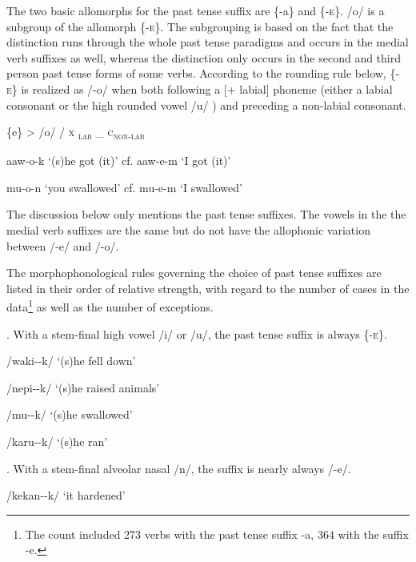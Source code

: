 The two basic allomorphs for the past tense suffix are \{-a\} and \{-\textsc{e}\}. /\textstyleStyleVernacularWordsItalic{-}o/ is a subgroup of the allomorph \{-\textsc{e}\}. The subgrouping is based on the fact that the  distinction runs through the whole past tense paradigms and occurs in the medial verb suffixes as well, whereas the \textstyleStyleVernacularWordsItalic{-} distinction only occurs in the second and third person past tense forms of some verbs.  According to the rounding rule below, \{-\textsc{e}\} is realized as /-o/ when both following a [+ labial] phoneme (either a labial consonant or the high rounded vowel /u/ ) and preceding a non-labial consonant. 

\{e\} {{\textgreater}} /o/  /  \textsc{x} \textsubscript{\textsc{lab}}  \_  \textsc{c}\textsubscript{\textsc{non-lab}}

aaw-o-k  `(s)he got (it)'  cf.  aaw-e-m  `I got (it)'

mu-o-n  `you swallowed'  cf.  mu-e-m  `I swallowed'

The discussion below only mentions the past tense suffixes. The vowels in the  the medial verb suffixes are the same but do not have the allophonic variation between /-e/ and /-o/.  

The morphophonological rules governing the choice of past tense suffixes are listed in their order of relative strength, with regard to the number of cases in the data\footnote{The count included 273 verbs with the past tense suffix  -a,  364 with the suffix -e.} as well as the number of exceptions.

.  With a stem-final high vowel /i/ or /u/, the past tense suffix is always \{\nobreakdash-\textsc{e}\}.

/waki--k/  `(s)he fell down'

/nepi--k/  `(s)he raised animals'

/mu--k/  `(s)he swallowed'

/karu--k/  `(s)he ran'

.  With a stem-final alveolar nasal /n/, the suffix is nearly always /-e/.

/kekan--k/  `it hardened'

